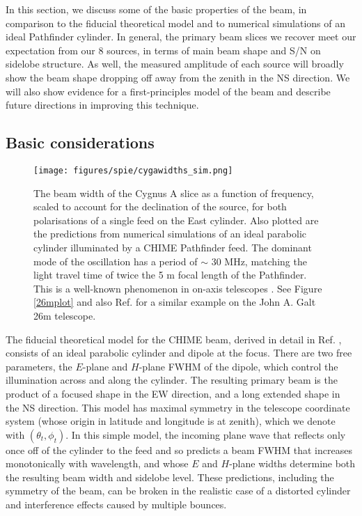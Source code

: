 In this section, we discuss some of the basic properties of the beam, in comparison to the fiducial theoretical model and to numerical simulations of an ideal Pathfinder cylinder. In general, the primary beam slices we recover meet our expectation from our 8 sources, in terms of main beam shape and S/N on sidelobe structure. As well, the measured amplitude of each source will broadly show the beam shape dropping off away from the zenith in the NS direction. We will also show evidence for a first-principles model of the beam and describe future directions in improving this technique.

\subsection{Basic considerations}

\begin{figure}[h!] %
	\centering
	\texttt{[image: figures/spie/cygawidths\_sim.png]}%
	\caption{The beam width of the Cygnus A slice as a function of frequency, scaled to account for the declination of the source, for both polarisations of a single feed on the East cylinder. Also plotted are the predictions from numerical simulations of an ideal parabolic cylinder illuminated by a CHIME Pathfinder feed. The dominant mode of the oscillation has a period of $\sim$ 30 MHz, matching the light travel time of twice the 5 m focal length of the Pathfinder. This is a well-known phenomenon in on-axis telescopes \citep{wander1, wander2}. See Figure \ref{26mplot} and also Ref. \citep{wolleben1} for a similar example on the John A. Galt 26m telescope.}
	\label{beamwidths}
\end{figure}

The fiducial theoretical model for the CHIME beam, derived in detail in Ref. \citep{mmodes2}, consists of an ideal parabolic cylinder and dipole at the focus. There are two free parameters, the $E$-plane and $H$-plane FWHM of the dipole, which control the illumination across and along the cylinder. The resulting primary beam is the product of a focused shape in the EW direction, and a long extended shape in the NS direction. This model has maximal symmetry in the telescope coordinate system (whose origin in latitude and longitude is at zenith), which we denote with $(\theta_t, \phi_t)$. In this simple model, the incoming plane wave that reflects only once off of the cylinder to the feed and so predicts a beam FWHM that increases monotonically with wavelength, and whose $E$ and $H$-plane widths determine both the resulting beam width and sidelobe level. These predictions, including the symmetry of the beam, can be broken in the realistic case of a distorted cylinder and interference effects caused by multiple bounces. 

